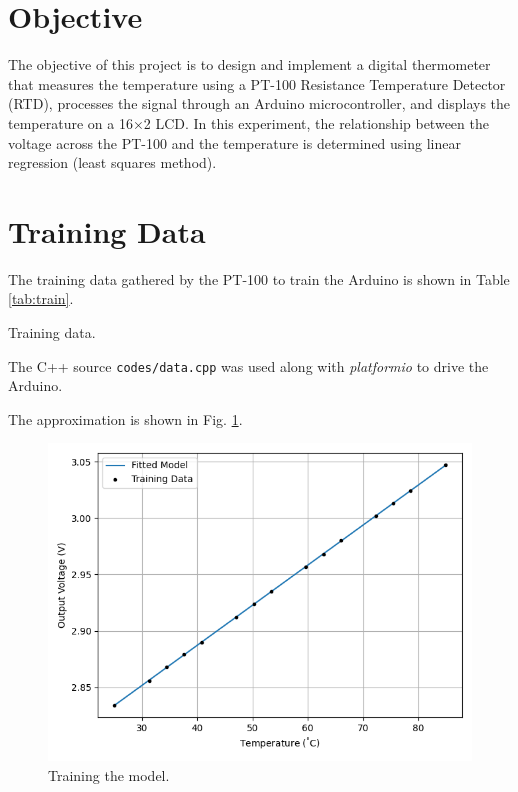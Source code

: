 \documentclass[journal,12pt,twocolumn]{IEEEtran}
\begin{document}
\section{Objective}
The objective of this project is to design and implement a digital thermometer that measures the temperature using a PT-100 Resistance Temperature Detector (RTD), processes the signal through an Arduino microcontroller, and displays the temperature on a 16×2 LCD. In this experiment, the relationship between the voltage across
the PT-100 and the temperature is determined using linear regression (least squares
method).

\section{Training Data}
The training data gathered by the PT-100 to train the Arduino is shown in Table
\ref{tab:train}.

\begin{table}[H]
    \centering
    
    \caption{Training data.}
    \label{tab:train}
\end{table}

The C++ source \texttt{codes/data.cpp} was used along with \textit{platformio}
to drive the Arduino.

The approximation is shown in Fig. \ref{fig:train}.
\begin{figure}[H]
    \centering
    \includegraphics[width=\columnwidth]{figs/train.png}
    \caption{Training the model.}
    \label{fig:train}
\end{figure}
\end{document}
